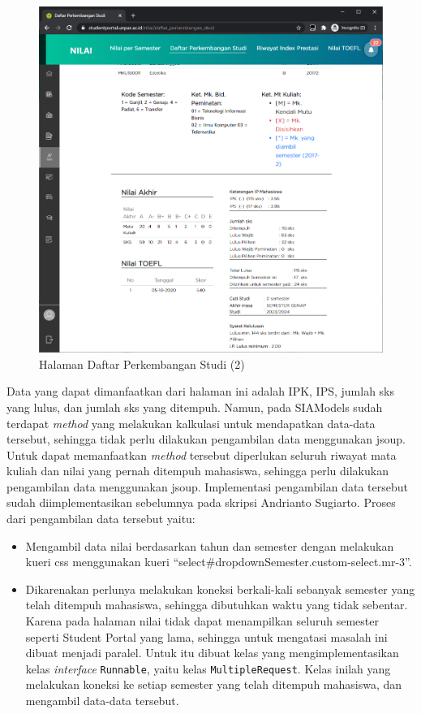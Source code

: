 \begin{itemize}
         \begin{figure}[H]
        	\centering
        	\includegraphics[scale=0.4]{Gambar/nilai_dps_2.png}
        	\caption{Halaman Daftar Perkembangan Studi (2)} 
        	\label{fig:3_dps_2}
        \end{figure}
        Data yang dapat dimanfaatkan dari halaman ini adalah IPK, IPS, jumlah sks yang lulus, dan jumlah sks yang ditempuh. Namun, pada SIAModels sudah terdapat \textit{method} yang melakukan kalkulasi untuk mendapatkan data-data tersebut, sehingga tidak perlu dilakukan pengambilan data menggunakan jsoup. Untuk dapat memanfaatkan \textit{method} tersebut diperlukan seluruh riwayat mata kuliah dan nilai yang pernah ditempuh mahasiswa, sehingga perlu dilakukan pengambilan data menggunakan jsoup.  Implementasi pengambilan data tersebut sudah diimplementasikan sebelumnya pada skripsi Andrianto Sugiarto. Proses dari pengambilan data tersebut yaitu:
        \begin{itemize}
            \item Mengambil data nilai berdasarkan tahun dan semester dengan melakukan kueri css menggunakan kueri ``select\#dropdownSemester.custom-select.mr-3''.
            \item Dikarenakan perlunya melakukan koneksi berkali-kali sebanyak semester yang telah ditempuh mahasiswa, sehingga dibutuhkan waktu yang tidak sebentar. Karena pada halaman nilai tidak dapat menampilkan seluruh semester seperti Student Portal yang lama, sehingga untuk mengatasi masalah ini dibuat menjadi paralel. Untuk itu dibuat kelas yang mengimplementasikan kelas \textit{interface} \texttt{Runnable}, yaitu kelas \texttt{MultipleRequest}. Kelas inilah yang melakukan koneksi ke setiap semester yang telah ditempuh mahasiswa, dan mengambil data-data tersebut.

\end{itemize}
\end{itemize}
